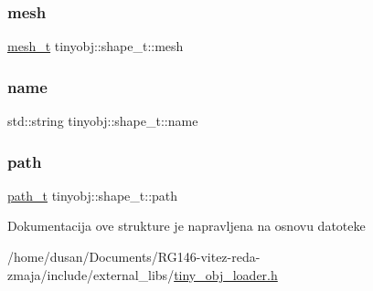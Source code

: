 \subsubsection{\texorpdfstring{mesh}{mesh}}
{\footnotesize\ttfamily \hyperlink{structtinyobj_1_1mesh__t}{mesh\+\_\+t} tinyobj\+::shape\+\_\+t\+::mesh}

\mbox{\label{structtinyobj_1_1shape__t_a98650e2e66d00934f68de88eafb34630}} 
\subsubsection{\texorpdfstring{name}{name}}
{\footnotesize\ttfamily std\+::string tinyobj\+::shape\+\_\+t\+::name}

\mbox{\label{structtinyobj_1_1shape__t_a3e25b80e1330260be137eb865ec0b958}} 
\subsubsection{\texorpdfstring{path}{path}}
{\footnotesize\ttfamily \hyperlink{structtinyobj_1_1path__t}{path\+\_\+t} tinyobj\+::shape\+\_\+t\+::path}



Dokumentacija ove strukture je napravljena na osnovu datoteke \begin{DoxyCompactItemize}
\item 
/home/dusan/\+Documents/\+R\+G146-\/vitez-\/reda-\/zmaja/include/external\+\_\+libs/\hyperlink{tiny__obj__loader_8h}{tiny\+\_\+obj\+\_\+loader.\+h}\end{DoxyCompactItemize}
